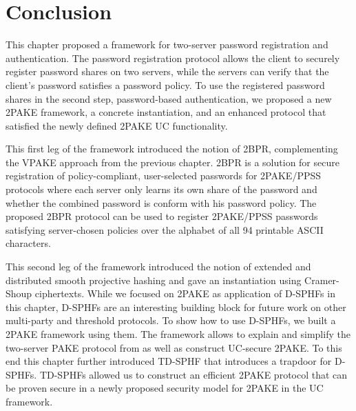 









\section{Conclusion} \label{sec:2pakeConclusion}
This chapter proposed a framework for two-server password registration and authentication.
The password registration protocol allows the client to securely register password shares on two servers, while the servers can verify that the client's password satisfies a password policy.
To use the registered password shares in the second step, password-based authentication, we proposed a new \ac{2PAKE} framework, a concrete instantiation, and an enhanced protocol that satisfied the newly defined \ac{2PAKE} \ac{UC} functionality.

This first leg of the framework introduced the notion of \ac{2BPR}, complementing the \ac{VPAKE} approach from the previous chapter.
\ac{2BPR} is a solution for secure registration of policy-compliant, user-selected passwords for \ac{2PAKE}/\ac{PPSS} protocols where each server only learns its own share of the password and whether the combined password is conform with his password policy.
The proposed \ac{2BPR} protocol can be used to register \ac{2PAKE}/\ac{PPSS} passwords satisfying server-chosen policies over the alphabet of all 94 printable \ac{ASCII} characters.

This second leg of the framework introduced the notion of extended and distributed smooth projective hashing and gave an instantiation using Cramer-Shoup ciphertexts.
While we focused on \ac{2PAKE} as application of \acp{D-SPHF} in this chapter, \acp{D-SPHF} are an interesting building block for future work on other multi-party and threshold protocols.
To show how to use \acp{D-SPHF}, we built a \ac{2PAKE} framework using them.
The framework allows to explain and simplify the two-server PAKE protocol from \cite{Katz2012a} as well as construct \ac{UC}-secure \ac{2PAKE}.
To this end this chapter further introduced \ac{TD-SPHF} that introduces a trapdoor for \acp{D-SPHF}.
\acp{TD-SPHF} allowed us to construct an efficient \ac{2PAKE} protocol that can be proven secure in a newly proposed security model for \ac{2PAKE} in the \ac{UC} framework.
